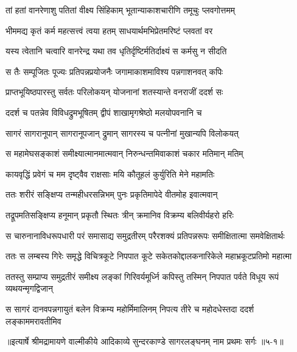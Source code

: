 \twolineshloka
{तां हतां वानरेणाशु पतितां वीक्ष्य सिंहिकाम्}
{भूतान्याकाशचारीणि तमूचुः प्लवगोत्तमम्} %

\twolineshloka
{भीममद्य कृतं कर्म महत्सत्त्वं त्वया हतम्}
{साधयार्थमभिप्रेतमरिष्टं प्लवतां वर} %

\twolineshloka
{यस्य त्वेतानि चत्वारि वानरेन्द्र यथा तव}
{धृतिर्दृष्टिर्मतिर्दाक्ष्यं स कर्मसु न सीदति} %

\twolineshloka
{स तैः सम्पूजितः पूज्यः प्रतिपन्नप्रयोजनैः}
{जगामाकाशमाविश्य पन्नगाशनवत् कपिः} %

\twolineshloka
{प्राप्तभूयिष्ठपारस्तु सर्वतः परिलोकयन्}
{योजनानां शतस्यान्ते वनराजीं ददर्श सः} %

\twolineshloka
{ददर्श च पतन्नेव विविधद्रुमभूषितम्}
{द्वीपं शाखामृगश्रेष्ठो मलयोपवनानि च} %

\twolineshloka
{सागरं सागरानूपान् सागरानूपजान् द्रुमान्}
{सागरस्य च पत्नीनां मुखान्यपि विलोकयत्} %

\twolineshloka
{स महामेघसङ्काशं समीक्ष्यात्मानमात्मवान्}
{निरुन्धन्तमिवाकाशं चकार मतिमान् मतिम्} %

\twolineshloka
{कायवृद्धिं प्रवेगं च मम दृष्ट्वैव राक्षसाः}
{मयि कौतूहलं कुर्युरिति मेने महामतिः} %

\twolineshloka
{ततः शरीरं सङ्क्षिप्य तन्महीधरसन्निभम्}
{पुनः प्रकृतिमापेदे वीतमोह इवात्मवान्} %

\twolineshloka
{तद्रूपमतिसङ्क्षिप्य हनूमान् प्रकृतौ स्थितः}
{त्रीन् क्रमानिव विक्रम्य बलिवीर्यहरो हरिः} %

\twolineshloka
{स चारुनानाविधरूपधारी परं समासाद्य समुद्रतीरम्}
{परैरशक्यं प्रतिपन्नरूपः समीक्षितात्मा समवेक्षितार्थः} %

\twolineshloka
{ततः स लम्बस्य गिरेः समृद्धे विचित्रकूटे निपपात कूटे}
{सकेतकोद्दालकनारिकेले महाभ्रकूटप्रतिमो महात्मा} %

\twolineshloka
{ततस्तु सम्प्राप्य समुद्रतीरं समीक्ष्य लङ्कां गिरिवर्यमूर्ध्नि}
{कपिस्तु तस्मिन् निपपात पर्वते विधूय रूपं व्यथयन्मृगद्विजान्} %

\twolineshloka
{स सागरं दानवपन्नगायुतं बलेन विक्रम्य महोर्मिमालिनम्}
{निपत्य तीरे च महोदधेस्तदा ददर्श लङ्काममरावतीमिव} %


॥इत्यार्षे श्रीमद्रामायणे वाल्मीकीये आदिकाव्ये सुन्दरकाण्डे सागरलङ्घनम् नाम प्रथमः सर्गः ॥५-१॥
